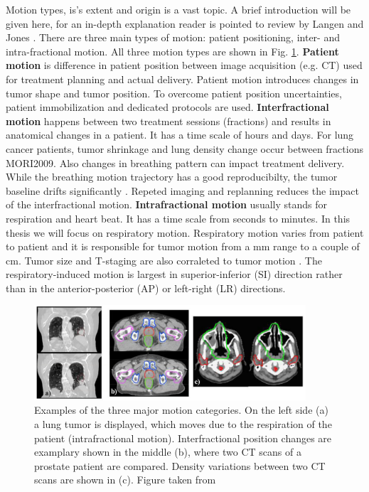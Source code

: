 \documentclass[type=dr, dr=rernat, accentcolor=tud7b,colorbacktitle, bigchapter, openright, twoside, 12pt ]{tudthesis}
\begin{document}
Motion types, is's extent and origin is a vast topic. A brief introduction will be given here, for an in-depth explanation reader is pointed to review by Langen and Jones \cite{Langen2001}.
There are three main types of motion: patient positioning, inter- and intra-fractional motion. All three motion types are shown in Fig. \ref{motion}.
\newline
\textbf{Patient motion} is difference in patient position between image acquisition (e.g. CT) used for treatment planning and actual delivery. Patient motion introduces changes in tumor shape and tumor position. To overcome patient 
position uncertainties, patient immobilization and dedicated protocols are used.
\newline
\textbf{Interfractional motion} happens between two treatment sessions (fractions) and results in anatomical changes in a patient. It has a time scale of hours and days. For lung cancer patients, tumor shrinkage and lung density change occur between fractions MORI2009. 
Also changes in breathing pattern can impact treatment delivery. While the breathing motion trajectory has a good reproducibilty, the tumor baseline drifts significantly \cite{Sonke2008}. Repeted imaging and replanning reduces the impact of the interfractional motion.
\newline
\textbf{Intrafractional motion} usually stands for respiration and heart beat. It has a time scale from seconds to minutes. In this thesis we will focus on respiratory motion. Respiratory motion varies from patient to patient and 
it is responsible for tumor motion from a mm range to a couple of cm. Tumor size and T-staging are also corraleted to tumor motion \cite{Liu2007}. The respiratory-induced motion is largest in superior-inferior (SI) direction rather than 
in the anterior-posterior (AP) or left-right (LR) directions.


\begin{figure}[H]
\begin{center}
\includegraphics[width=0.9\textwidth]{./Images/motion_examples.png}
\caption{Examples of the three major motion categories. On the left side (a) a lung tumor is displayed, which moves due to the respiration 
of the patient (intrafractional motion). Interfractional position changes are examplary shown in the middle (b), where two CT scans of a 
prostate patient are compared. Density variations between two CT scans are shown in (c). Figure taken from \cite{Eng11}}
\label{motion}
\end{center}
\end{figure}
\end{document}
